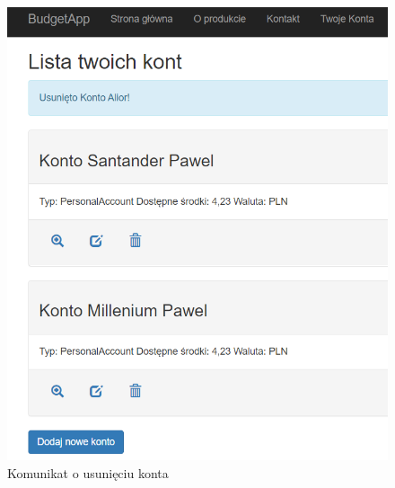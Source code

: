 \begin{figure}[ht]
	\centering
\includegraphics[scale=.38]{rys04/usunieto.PNG}
	\caption{Komunikat o usunięciu konta}
	\label{fig:ss-5}
\end{figure}